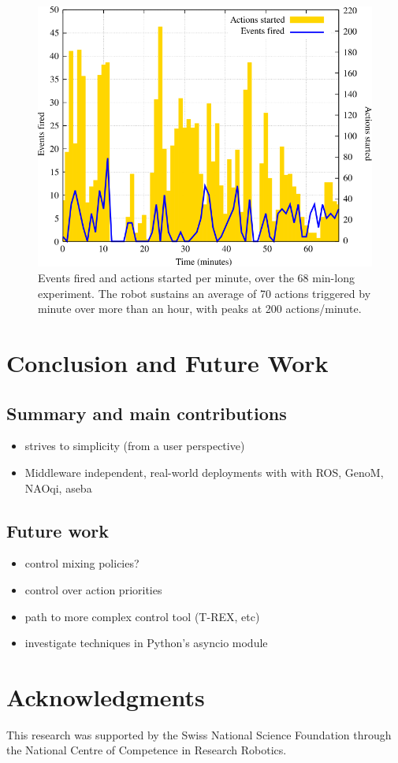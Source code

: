 \documentclass[a4paper, 10pt, conference]{ieeeconf}      %
\begin{document}
\begin{figure}
    \centering
    \includegraphics[width=0.9\columnwidth]{croquignole-expe}
    \caption{Events fired and actions started per minute, over the 68 min-long
    experiment. The robot sustains an average of 70 actions triggered by minute over
    more than an hour, with peaks at 200 actions/minute.}

\end{figure}

\section{Conclusion and Future Work}

\subsection{Summary and main contributions}

\begin{itemize}
    \item strives to simplicity (from a user perspective)
    \item Middleware independent, real-world deployments with with ROS, GenoM, NAOqi, aseba
\end{itemize}

\subsection{Future work}

\begin{itemize}
    \item control mixing policies?
    \item control over action priorities
    \item path to more complex control tool (T-REX, etc)
    \item investigate techniques in Python's {\sc asyncio} module
\end{itemize}

\section*{Acknowledgments}

This research was supported by the Swiss National Science Foundation through the
National Centre of Competence in Research Robotics.




\end{document}
